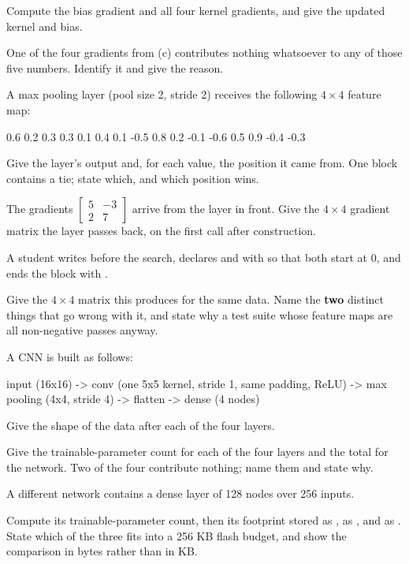  Compute the bias gradient and all four kernel gradients, and give the updated kernel and
bias.

One of the four gradients from (c) contributes nothing whatsoever to any of those five numbers.
Identify it and give the reason. 

\label{exa:q:8}

A max pooling layer (pool size 2, stride 2) receives the following $4 \times 4$ feature map:

\begin{console}
 0.6   0.2   0.3   0.3
 0.1   0.4   0.1  -0.5
 0.8   0.2  -0.1  -0.6
 0.5   0.9  -0.4  -0.3
\end{console}

 Give the layer's output and, for each value, the position it came from. One block contains
a tie; state which, and which position wins. 

 The gradients $\begin{bmatrix} 5 & -3 \\ 2 & 7 \end{bmatrix}$ arrive from the layer in
front. Give the $4 \times 4$ gradient matrix the layer passes back, on the first call after
construction. 

 A student writes  before the search, declares 
and  with \code{{}} so that both start at 0, and ends the block with
.

Give the $4 \times 4$ matrix this produces for the same data. Name the \textbf{two} distinct things
that go wrong with it, and state why a test suite whose feature maps are all non-negative passes
anyway. 

\label{exa:q:9}

A CNN is built as follows:

\begin{console}
input (16x16) -> conv (one 5x5 kernel, stride 1, same padding, ReLU)
              -> max pooling (4x4, stride 4)
              -> flatten
              -> dense (4 nodes)
\end{console}

 Give the shape of the data after each of the four layers. 

 Give the trainable-parameter count for each of the four layers and the total for the
network. Two of the four contribute nothing; name them and state why. 

 A different network contains a dense layer of 128 nodes over 256 inputs.

Compute its trainable-parameter count, then its footprint stored as , as ,
and as . State which of the three fits into a 256 KB flash budget, and show the comparison
in bytes rather than in KB. 
